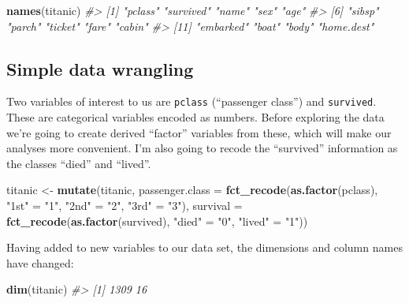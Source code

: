 \documentclass[]{book}
\newenvironment{Shaded}{\begin{snugshade}}{\end{snugshade}}
\newcommand{\CommentTok}[1]{\textcolor[rgb]{0.56,0.35,0.01}{\textit{#1}}}
\newcommand{\DataTypeTok}[1]{\textcolor[rgb]{0.13,0.29,0.53}{#1}}
\newcommand{\KeywordTok}[1]{\textcolor[rgb]{0.13,0.29,0.53}{\textbf{#1}}}
\newcommand{\NormalTok}[1]{#1}
\newcommand{\StringTok}[1]{\textcolor[rgb]{0.31,0.60,0.02}{#1}}
\theoremstyle{definition}
\theoremstyle{definition}
\theoremstyle{definition}
\theoremstyle{remark}
\begin{document}
\begin{Shaded}
\begin{Highlighting}[]
\KeywordTok{names}\NormalTok{(titanic)}
\CommentTok{#>  [1] "pclass"    "survived"  "name"      "sex"       "age"      }
\CommentTok{#>  [6] "sibsp"     "parch"     "ticket"    "fare"      "cabin"    }
\CommentTok{#> [11] "embarked"  "boat"      "body"      "home.dest"}
\end{Highlighting}
\end{Shaded}

\hypertarget{simple-data-wrangling}{%
\subsection{Simple data wrangling}\label{simple-data-wrangling}}

Two variables of interest to us are \texttt{pclass} (``passenger
class'') and \texttt{survived}. These are categorical variables encoded
as numbers. Before exploring the data we're going to create derived
``factor'' variables from these, which will make our analyses more
convenient. I'm also going to recode the ``survived'' information as the
classes ``died'' and ``lived''.

\begin{Shaded}
\begin{Highlighting}[]
\NormalTok{titanic <-}\StringTok{ }\KeywordTok{mutate}\NormalTok{(titanic, }
                  \DataTypeTok{passenger.class =} \KeywordTok{fct_recode}\NormalTok{(}\KeywordTok{as.factor}\NormalTok{(pclass),}
                                               \StringTok{"1st"}\NormalTok{ =}\StringTok{ "1"}\NormalTok{, }\StringTok{"2nd"}\NormalTok{ =}\StringTok{ "2"}\NormalTok{, }\StringTok{"3rd"}\NormalTok{ =}\StringTok{ "3"}\NormalTok{),}
                  \DataTypeTok{survival =} \KeywordTok{fct_recode}\NormalTok{(}\KeywordTok{as.factor}\NormalTok{(survived), }
                                        \StringTok{"died"}\NormalTok{ =}\StringTok{ "0"}\NormalTok{, }\StringTok{"lived"}\NormalTok{ =}\StringTok{ "1"}\NormalTok{))}
\end{Highlighting}
\end{Shaded}

Having added to new variables to our data set, the dimensions and column
names have changed:

\begin{Shaded}
\begin{Highlighting}[]
\KeywordTok{dim}\NormalTok{(titanic)}
\CommentTok{#> [1] 1309   16}
\end{Highlighting}
\end{Shaded}
\end{document}
